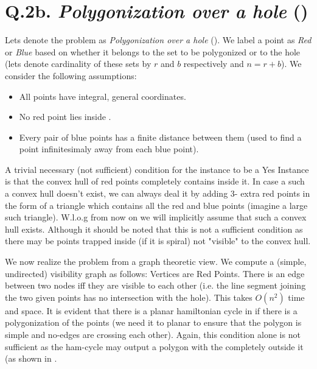 

\section*{Q.2b. \emph{Polygonization over a hole} (\ph)}
Lets denote the problem as  \emph{Polygonization over a hole} (\ph). We label a point as \emph{Red} or \emph{Blue} based on whether it belongs to the set to be polygonized or to the hole (lets denote cardinality of these sets by $r$ and $b$ respectively and $n=r+b$). We consider the following assumptions:
\begin{multicols}{2}
	\begin{itemize}
		\item All points have integral, general coordinates.
		\item No red point lies inside \HH.
		\item Every pair of blue points has a finite distance between them (used to find a point infinitesimaly away from each blue point).
	\end{itemize}
\end{multicols}
A trivial necessary (not sufficient) condition for the instance to be a Yes Instance is that the convex hull of red points completely contains \HH inside it. In case a such a convex hull doesn't exist, we can always deal it by adding $3$- extra red points in the form of a triangle which contains all the red and blue points (imagine a large such triangle). W.l.o.g from now on we will implicitly assume that such a convex hull exists. Although it should be noted that this is not a sufficient condition as there may be points trapped inside \HH (if it is spiral) not "visible" to the convex hull.


We now realize the problem from a graph theoretic view. We compute a (simple, undirected) visibility graph \GG as follows: Vertices are Red Points. There is an edge between two nodes iff they are visible to each other (i.e. the line segment joining the two given points has no intersection with the hole). This takes $O(n^2)$ time and space. It is evident that there is a planar hamiltonian cycle in \GG if there is a polygonization of the points (we need it to planar to ensure that the polygon is simple and no-edges are crossing each other).
Again, this condition alone is not sufficient as the ham-cycle may output a polygon with the \HH completely outside it (as shown in .


